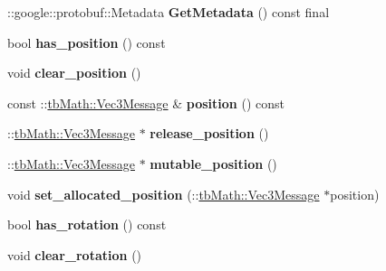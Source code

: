 \begin{DoxyCompactItemize}
\mbox{\label{classtbBasics_1_1MoveActorBody_a191434a1e56e7120f3d54a6e1c3f4275}} 
\+::google\+::protobuf\+::\+Metadata {\bfseries Get\+Metadata} () const final
\item 
\mbox{\label{classtbBasics_1_1MoveActorBody_aec804c5d33150abbb916e66eb1d9a2a9}} 
bool {\bfseries has\+\_\+position} () const
\item 
\mbox{\label{classtbBasics_1_1MoveActorBody_a7e6ae9eccb536874653941a23c7ab3db}} 
void {\bfseries clear\+\_\+position} ()
\item 
\mbox{\label{classtbBasics_1_1MoveActorBody_a000e1f9f7ffe1c41ae80fb36c427d8f8}} 
const \+::\hyperlink{classtbMath_1_1Vec3Message}{tb\+Math\+::\+Vec3\+Message} \& {\bfseries position} () const
\item 
\mbox{\label{classtbBasics_1_1MoveActorBody_a84b6544b6e9067c5f49b2ef8b3bbaa43}} 
\+::\hyperlink{classtbMath_1_1Vec3Message}{tb\+Math\+::\+Vec3\+Message} $\ast$ {\bfseries release\+\_\+position} ()
\item 
\mbox{\label{classtbBasics_1_1MoveActorBody_a9fd06cd959263de304b00cbde26b9e67}} 
\+::\hyperlink{classtbMath_1_1Vec3Message}{tb\+Math\+::\+Vec3\+Message} $\ast$ {\bfseries mutable\+\_\+position} ()
\item 
\mbox{\label{classtbBasics_1_1MoveActorBody_a171de6e43fd7048e9ffbbd0c56745022}} 
void {\bfseries set\+\_\+allocated\+\_\+position} (\+::\hyperlink{classtbMath_1_1Vec3Message}{tb\+Math\+::\+Vec3\+Message} $\ast$position)
\item 
\mbox{\label{classtbBasics_1_1MoveActorBody_a87f34e3136af787ba0d0123cf41c20c0}} 
bool {\bfseries has\+\_\+rotation} () const
\item 
\mbox{\label{classtbBasics_1_1MoveActorBody_a0bae87c1c3730402c0c21646740763bc}} 
void {\bfseries clear\+\_\+rotation} ()
\item 
\mbox{\label{classtbBasics_1_1MoveActorBody_a229bcf882dcd153d8454a85b707b3b4f}} 

\end{DoxyCompactItemize}
